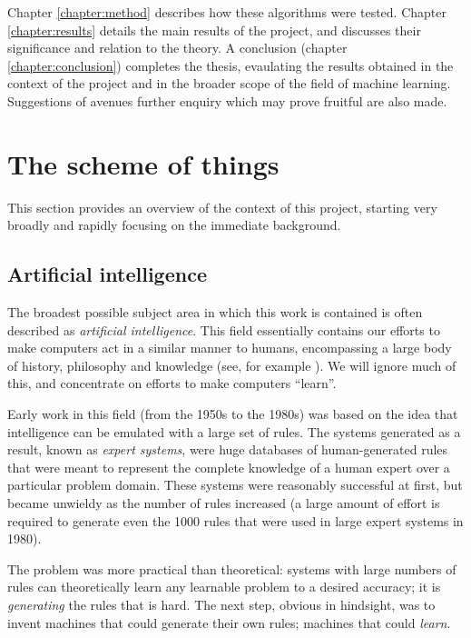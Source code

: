 Chapter \ref{chapter:method} describes how these algorithms were
tested.  Chapter \ref{chapter:results} details the main results of the
project, and discusses their significance and relation to the theory.
A conclusion (chapter \ref{chapter:conclusion}) completes the thesis, 
evaulating the results obtained in the context of the project and in
the broader scope of the field of machine learning.  Suggestions of
avenues further enquiry which may prove fruitful are also made.

\section{The scheme of things}

This section provides an overview of the context of this project,
starting very broadly and rapidly focusing on the immediate
background. 


\subsection{Artificial intelligence}

The broadest possible subject area in which this work is contained is
often described as \emph{artificial intelligence}.  This field
essentially contains our efforts to make computers act in a similar
manner to humans, encompassing a large body of history, philosophy and
knowledge (see, for example \cite{Penrose89}).  We will ignore much
of this, and concentrate on efforts to make computers ``learn''.

Early work in this field (from the 1950s to the 1980s) was based on
the idea that intelligence can be emulated with a large set of rules.
The systems generated as a result, known as \emph{expert systems},
were huge databases of human-generated rules that were meant to
represent the complete knowledge of a human expert over a particular
problem domain.  These systems were reasonably successful at first,
but became unwieldy as the number of rules increased (a large amount
of effort is required to generate even the 1000 rules that were used
in large expert systems in 1980). 

The problem was more practical than theoretical: systems with large
numbers of rules can theoretically learn any learnable problem to a
desired accuracy; it is \emph{generating} the rules that is hard.  The
next step, obvious in hindsight, was to invent machines that could
generate their own rules; machines that could \emph{learn}.



